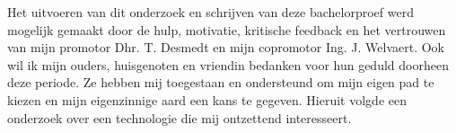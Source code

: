 \bigbreak{}

Het uitvoeren van dit onderzoek en schrijven van deze bachelorproef werd mogelijk gemaakt door de hulp, motivatie, kritische feedback en het vertrouwen van mijn promotor Dhr. T. Desmedt en mijn copromotor Ing. J. Welvaert. Ook wil ik mijn ouders, huisgenoten en vriendin bedanken voor hun geduld doorheen deze periode. Ze hebben mij toegestaan en ondersteund om mijn eigen pad te kiezen en mijn eigenzinnige aard een kans te gegeven. Hieruit volgde een onderzoek over een technologie die mij ontzettend interesseert.
